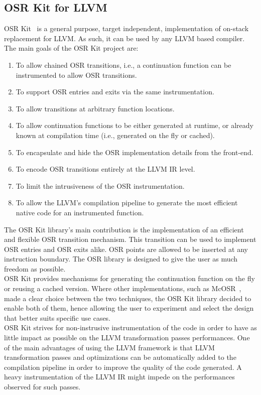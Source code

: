 \subsection{OSR Kit for LLVM}\label{describeOSRKit}
OSR Kit~\cite{OSRKit} is a general purpose, target independent, implementation of on-stack replacement for LLVM.
As such, it can be used by any LLVM based compiler.
The main goals of the OSR Kit project are:
\begin{enumerate}
    \item To allow chained OSR transitions, i.e., a continuation function can be instrumented to allow OSR transitions.
    \item To support OSR entries and exits via the same instrumentation.
    \item To allow transitions at arbitrary function locations.
    \item To allow continuation functions to be either generated at runtime, or already known at compilation time (i.e., generated on the fly or cached).
    \item To encapsulate and hide the OSR implementation details from the front-end.
    \item To encode OSR transitions entirely at the LLVM IR level.
    \item To limit the intrusiveness of the OSR instrumentation.
    \item To allow the LLVM's compilation pipeline to generate the most efficient native code for an instrumented function. \label{llvmTransformPasses}
\end{enumerate}

The OSR Kit library's main contribution is the implementation of an efficient and flexible OSR transition mechanism.
This transition can be used to implement OSR entries and OSR exits alike.
OSR points are allowed to be inserted at any instruction boundary. 
The OSR library is designed to give the user as much freedom as possible.\\

OSR Kit provides mechanisms for generating the continuation function on the fly or reusing a cached version.
Where other implementations, such as McOSR~\cite{lameed2013modular}, made a clear choice between the two techniques, the OSR Kit library decided to enable both of them, hence allowing the user to experiment and select the design that better suits specific use cases.\\

OSR Kit strives for non-instrusive instrumentation of the code in order to have as little impact as possible on the LLVM transformation passes performances.
One of the main advantages of using the LLVM framework is that LLVM transformation passes and optimizations can be automatically added to the compilation pipeline in order to improve the quality of the code generated.
A heavy instrumentation of the LLVM IR might impede on the performances observed for such passes.\\

